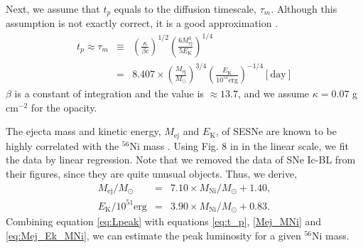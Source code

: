 \documentclass[twocolumn, linenumbers]{aastex62}
\begin{document}
Next, we assume that $t_p$ equals to the diffusion timescale, $\tau_m$. Although this assumption is not exactly correct, it is a good approximation \citep{2016MNRAS.457..328L}. 
\begin{eqnarray}
\label{eq:t_p}
t_p \approx \tau_m &\equiv& \left(\frac{\kappa}{\beta c}\right)^{1/2} \left(\frac{6 M_{\mathrm{ej}}^3}{5 E_{\mathrm{K}}} \right)^{1/4} \nonumber \\
&=& 8.407 \times \left(\frac{M_{\mathrm{ej}}}{M_{\odot}} \right)^{3/4} \left( \frac{E_{\mathrm{K}}}{10^{51} \mathrm{erg}} \right)^{-1/4} [\mathrm{day}]
\end{eqnarray}
$\beta$ is a constant of integration and the value is $\approx 13.7$, and we assume $\kappa = 0.07 $ g cm$^{-2}$ for the opacity.  

The ejecta mass and kinetic energy, $M_{\mathrm{ej}}$ and $E_{\mathrm{K}}$, of SESNe are known to be highly correlated with the $^{56}$Ni mass \citep{2016MNRAS.457..328L}. Using Fig. 8 in \citet{2016MNRAS.457..328L} in the linear scale, we fit the data by linear regression. Note that we removed the data of SNe Ic-BL from their figures, since they are quite unusual objects. Thus, we derive,
\begin{eqnarray}
\label{Mej_MNi}
M_{\mathrm{ej}}/M_{\odot} &=& 7.10 \times M_{\mathrm{Ni}}/M_{\odot} + 1.40, \\
E_{\mathrm{K}}/10^{51} \mathrm{erg} &=& 3.90 \times M_{\mathrm{Ni}}/M_{\odot} + 0.83.
\label{eq:Mej_Ek_MNi}
\end{eqnarray}
Combining equation \ref{eq:Lpeak} with equations \ref{eq:t_p}, \ref{Mej_MNi} and \ref{eq:Mej_Ek_MNi}, we can estimate the peak luminosity for a given $^{56}$Ni mass.

\end{document}
